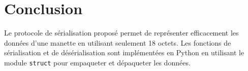 \documentclass{article}
\begin{document}
\section{Conclusion}

Le protocole de sérialisation proposé permet de représenter efficacement les données d'une manette en utilisant seulement 18 octets. Les fonctions de sérialisation et de désérialisation sont implémentées en Python en utilisant le module \texttt{struct} pour empaqueter et dépaqueter les données.
\end{document}
